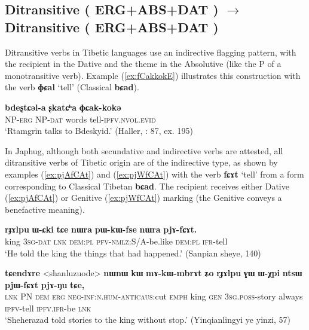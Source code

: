 \documentclass[oneside,a4paper,11pt]{article}
\makeatletter
\newcommand{\ipa}[1]{{\phon\textbf{\mbox{#1}}}} %
\newcommand{\refb}[1]{(\ref{#1})}
\def\fakesc#1{%
  \begingroup%
  \xdef\fake@name{\csname\curr@fontshape/\f@size\endcsname}%
  \fontsize{\fontdimen8\fake@name}{\baselineskip}\selectfont%
  \uppercase{#1}%
  \endgroup%
}
\makeatother
\begin{document}
  \subsection{Ditransitive (\fakesc{erg+abs+dat})  $\rightarrow$ Ditransitive (\fakesc{erg+abs+dat})}
Ditransitive verbs in Tibetic languages use an indirective flagging pattern, with the recipient in the Dative and the theme in the Absolutive (like the P of a monotransitive verb). Example \refb{ex:fCakkokE} illustrates this construction with the verb \ipa{ɸɕal} `tell' (Classical \ipa{bɕad}).

\begin{exe}
\ex \label{ex:fCakkokE}
\gll \ipa{ʂtamɖʐən-ɣə}  \ipa{bdeʂtɕəl-a} \ipa{ʂkatɕʰa} \ipa{ɸɕak-kokə} \\
NP-\textsc{erg} NP-\textsc{dat} words tell-\textsc{ipfv.nvol.evid} \\
\glt `Rtamgrin talks to Bdeskyid.' (Haller, \citeyear{haller04themchen}: 87, ex. 195)
\end{exe}

In Japhug, although both secundative and indirective verbs are attested, all ditransitive verbs of Tibetic origin are of the indirective type, as shown by examples \refb{ex:pjAfCAt} and \refb{ex:pjWfCAt} with the verb \ipa{fɕɤt} `tell' from a form corresponding to Classical Tibetan \ipa{bɕad}. The recipient receives either Dative (\ref{ex:pjAfCAt}) or Genitive (\ref{ex:pjWfCAt}) marking (the Genitive conveys a benefactive meaning).

\begin{exe}
\ex \label{ex:pjAfCAt}
\gll
  \ipa{rɟɤlpu} 	\ipa{ɯ-ɕki} 	\ipa{tɕe} 	\ipa{nɯra} 	\ipa{pɯ-kɯ-fse} 	\ipa{nɯra} 	\ipa{pjɤ-fɕɤt.} \\
  king \textsc{3sg-dat} \textsc{lnk} \textsc{dem:pl} \textsc{pfv-nmlz}:S/A-be.like  \textsc{dem:pl} \textsc{ifr}-tell \\
  \glt `He told the king the things that had happened.' (Sanpian sheye, 140)
\end{exe}

\begin{exe}
\ex \label{ex:pjWfCAt}
\gll
  \ipa{tɕendɤre} 	<shanluzuode> 	\ipa{nɯnɯ} 	\ipa{kɯ} 	\ipa{mɤ-kɯ-mbrɤt} 	\ipa{ʑo} 	\ipa{rɟɤlpu} 	\ipa{ɣɯ} 	\ipa{ɯ-χpi} 	\ipa{ntsɯ} 	\ipa{pjɯ-fɕɤt} 	\ipa{pjɤ-ŋu} 	\ipa{tɕe,} \\
  \textsc{lnk} PN \textsc{dem} \textsc{erg} \textsc{neg-inf:n.hum}-\textsc{anticaus}:cut \textsc{emph} king \textsc{gen} \textsc{3sg.poss}-story always \textsc{ipfv}-tell \textsc{ipfv.ifr}-be \textsc{lnk} \\
\glt `Sheherazad told stories to the king without stop.' (Yinqianlingyi ye yinzi, 57)
\end{exe}
\end{document}
